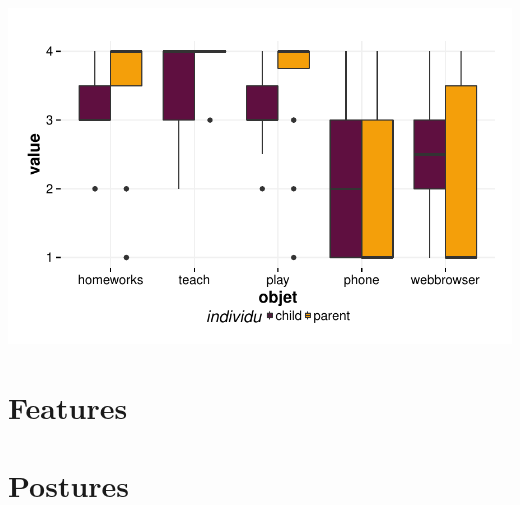 \documentclass{article}
\begin{document}
\includegraphics{interviews-plot_functionality_parent_enfant}




\section{Features}


\section{Postures}
\end{document}
